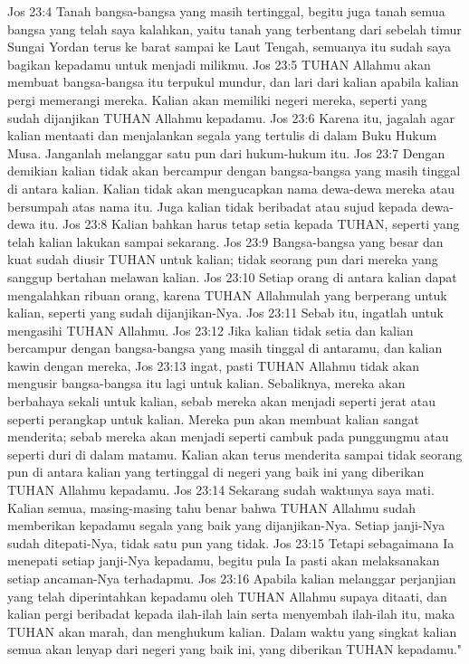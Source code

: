 Jos 23:4  Tanah bangsa-bangsa yang masih tertinggal, begitu juga tanah semua bangsa yang telah saya kalahkan, yaitu tanah yang terbentang dari sebelah timur Sungai Yordan terus ke barat sampai ke Laut Tengah, semuanya itu sudah saya bagikan kepadamu untuk menjadi milikmu.
Jos 23:5  TUHAN Allahmu akan membuat bangsa-bangsa itu terpukul mundur, dan lari dari kalian apabila kalian pergi memerangi mereka. Kalian akan memiliki negeri mereka, seperti yang sudah dijanjikan TUHAN Allahmu kepadamu.
Jos 23:6  Karena itu, jagalah agar kalian mentaati dan menjalankan segala yang tertulis di dalam Buku Hukum Musa. Janganlah melanggar satu pun dari hukum-hukum itu.
Jos 23:7  Dengan demikian kalian tidak akan bercampur dengan bangsa-bangsa yang masih tinggal di antara kalian. Kalian tidak akan mengucapkan nama dewa-dewa mereka atau bersumpah atas nama itu. Juga kalian tidak beribadat atau sujud kepada dewa-dewa itu.
Jos 23:8  Kalian bahkan harus tetap setia kepada TUHAN, seperti yang telah kalian lakukan sampai sekarang.
Jos 23:9  Bangsa-bangsa yang besar dan kuat sudah diusir TUHAN untuk kalian; tidak seorang pun dari mereka yang sanggup bertahan melawan kalian.
Jos 23:10  Setiap orang di antara kalian dapat mengalahkan ribuan orang, karena TUHAN Allahmulah yang berperang untuk kalian, seperti yang sudah dijanjikan-Nya.
Jos 23:11  Sebab itu, ingatlah untuk mengasihi TUHAN Allahmu.
Jos 23:12  Jika kalian tidak setia dan kalian bercampur dengan bangsa-bangsa yang masih tinggal di antaramu, dan kalian kawin dengan mereka,
Jos 23:13  ingat, pasti TUHAN Allahmu tidak akan mengusir bangsa-bangsa itu lagi untuk kalian. Sebaliknya, mereka akan berbahaya sekali untuk kalian, sebab mereka akan menjadi seperti jerat atau seperti perangkap untuk kalian. Mereka pun akan membuat kalian sangat menderita; sebab mereka akan menjadi seperti cambuk pada punggungmu atau seperti duri di dalam matamu. Kalian akan terus menderita sampai tidak seorang pun di antara kalian yang tertinggal di negeri yang baik ini yang diberikan TUHAN Allahmu kepadamu.
Jos 23:14  Sekarang sudah waktunya saya mati. Kalian semua, masing-masing tahu benar bahwa TUHAN Allahmu sudah memberikan kepadamu segala yang baik yang dijanjikan-Nya. Setiap janji-Nya sudah ditepati-Nya, tidak satu pun yang tidak.
Jos 23:15  Tetapi sebagaimana Ia menepati setiap janji-Nya kepadamu, begitu pula Ia pasti akan melaksanakan setiap ancaman-Nya terhadapmu.
Jos 23:16  Apabila kalian melanggar perjanjian yang telah diperintahkan kepadamu oleh TUHAN Allahmu supaya ditaati, dan kalian pergi beribadat kepada ilah-ilah lain serta menyembah ilah-ilah itu, maka TUHAN akan marah, dan menghukum kalian. Dalam waktu yang singkat kalian semua akan lenyap dari negeri yang baik ini, yang diberikan TUHAN kepadamu."
